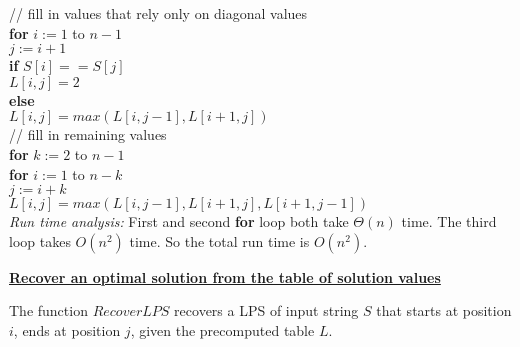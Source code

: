\documentclass[11pt]{article}
\begin{document}
\begin{enumerate}
  \-\hspace{2em} // fill in values that rely only on diagonal values\\
  \-\hspace{2em} \textbf{for} $i := 1$ to $n-1$\\
  \-\hspace{4em} $j := i + 1$\\
  \-\hspace{4em} \textbf{if} $S[i] == S[j]$\\
  \-\hspace{6em} $L[i,j] = 2$\\
  \-\hspace{4em} \textbf{else}\\
  \-\hspace{6em} $L[i,j] = max(L[i,j-1], L[i+1,j])$\\

  \-\hspace{2em} // fill in remaining values \\
  \-\hspace{2em} \textbf{for} $k := 2$ to $n-1$\\
  \-\hspace{4em} \textbf{for} $i := 1$ to $n-k$\\
  \-\hspace{6em} $j := i + k$\\
  \-\hspace{6em} $L[i,j] = max(L[i,j-1], L[i+1,j], L[i+1,j-1])$\\

  \emph{Run time analysis:} First and second \textbf{for} loop both
  take $\Theta(n)$ time. The third loop takes $O(n^2)$ time. So the
  total run time is $O(n^2)$.

  \underline{\textbf{Recover an optimal solution from the table of
      solution values}}

  The function $RecoverLPS$ recovers a LPS of input string $S$ that
  starts at position $i$, ends at position $j$, given the precomputed
  table $L$.


\end{enumerate}
\end{document}
